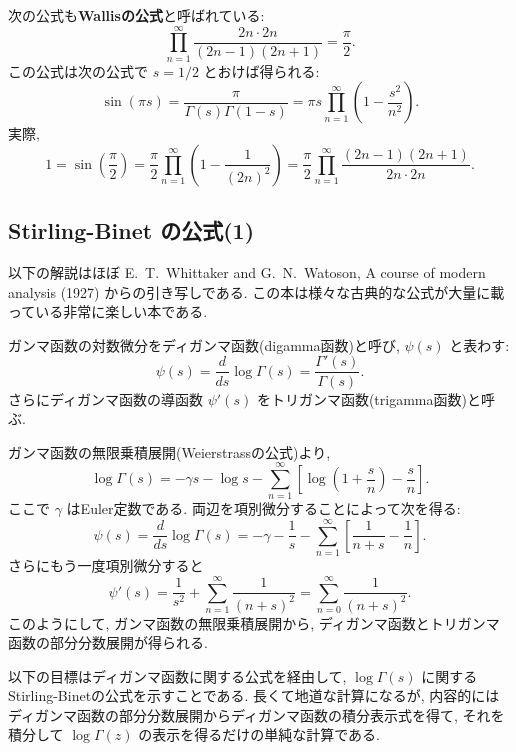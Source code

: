 \documentclass[12pt,twoside]{jarticle}
\theoremstyle{jplain}
\theoremstyle{jplain}
\theoremstyle{jplain}
\numberwithin{theorem}{section}
\numberwithin{equation}{section}
\numberwithin{figure}{section}
\numberwithin{table}{section}
\begin{document}
次の公式も{\bf Wallisの公式}と呼ばれている:
\[
\prod_{n=1}^\infty\frac{2n\cdot 2n}{(2n-1)(2n+1)} = \frac{\pi}{2}.
\] 
この公式は次の公式で $s=1/2$ とおけば得られる:
\[
\sin(\pi s) 
= \frac{\pi}{\Gamma(s)\Gamma(1-s)}
= \pi s\prod_{n=1}^\infty\left(1-\frac{s^2}{n^2}\right).
\]
実際, 
\[
1=\sin\left(\frac{\pi}{2}\right)
=\frac{\pi}{2}\prod_{n=1}^\infty\left(1-\frac{1}{(2n)^2}\right)
=\frac{\pi}{2}\prod_{n=1}^\infty\frac{(2n-1)(2n+1)}{2n\cdot 2n}.
\]


\subsection{Stirling-Binet の公式(1)}
\label{sec:Binet1}

以下の解説はほぼ 
E.~T.~Whittaker and G.~N.~Watoson, A course of modern analysis (1927)
からの引き写しである.
この本は様々な古典的な公式が大量に載っている非常に楽しい本である.

ガンマ函数の対数微分をディガンマ函数(digamma函数)と呼び, $\psi(s)$ と表わす:
\[
\psi(s)=\frac{d}{ds}\log\Gamma(s)=\frac{\Gamma'(s)}{\Gamma(s)}.
\]
さらにディガンマ函数の導函数 $\psi'(s)$ をトリガンマ函数(trigamma函数)と呼ぶ.

ガンマ函数の無限乗積展開(Weierstrassの公式)より,
\[
\log\Gamma(s)
=
-\gamma s - \log s 
-\sum_{n=1}^\infty\left[\log\left(1+\frac{s}{n}\right)-\frac{s}{n}\right].
\]
ここで $\gamma$ はEuler定数である.
両辺を項別微分することによって次を得る:
\[
\psi(s)=\frac{d}{ds}\log\Gamma(s)
=
-\gamma - \frac{1}{s} 
-\sum_{n=1}^\infty\left[\frac{1}{n+s}-\frac{1}{n} \right].
\]
さらにもう一度項別微分すると
\[
\psi'(s)
=\frac{1}{s^2}+\sum_{n=1}^\infty\frac{1}{(n+s)^2}
=\sum_{n=0}^\infty\frac{1}{(n+s)^2}.
\]
このようにして, ガンマ函数の無限乗積展開から, 
ディガンマ函数とトリガンマ函数の部分分数展開が得られる.

以下の目標はディガンマ函数に関する公式を経由して, 
$\log\Gamma(s)$ に関するStirling-Binetの公式を示すことである.
長くて地道な計算になるが, 内容的には
ディガンマ函数の部分分数展開からディガンマ函数の積分表示式を得て, 
それを積分して $\log\Gamma(z)$ の表示を得るだけの単純な計算である.
\end{document}
